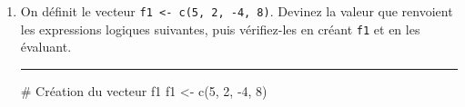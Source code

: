 \documentclass[12pt,twosided, notitlepage]{book}
\newenvironment{Shaded}{}{}
\newcommand{\CommentTok}[1]{\textcolor[rgb]{0.00,0.50,0.00}{#1}}
\newcommand{\DecValTok}[1]{#1}
\newcommand{\KeywordTok}[1]{\textcolor[rgb]{0.00,0.00,1.00}{#1}}
\newcommand{\NormalTok}[1]{#1}
\newcommand{\OperatorTok}[1]{#1}
\newcommand{\StringTok}[1]{\textcolor[rgb]{0.00,0.50,0.50}{#1}}
\newif \ifsol
\renewenvironment{Shaded}{\begin{snugshade}}{\end{snugshade}}
\begin{document}
\begin{enumerate}
\def\labelenumi{\alph{enumi}.}
\item
  On définit le vecteur \texttt{f1\ \textless{}-\ c(5,\ 2,\ -4,\ 8)}.
  Devinez la valeur que renvoient les expressions logiques suivantes,
  puis vérifiez-les en créant \texttt{f1} et en les
  évaluant.\index{\texttt{==}}\index{\texttt{<}}\index{\texttt{\&}}

\begin{Shaded}
\end{Shaded}

  \ifsol 

  \begin{center} \rule{0.5\linewidth}{\linethickness}\end{center}

\begin{Shaded}
\begin{Highlighting}[]
\CommentTok{# Création du vecteur f1}
\NormalTok{f1 <-}\StringTok{ }\KeywordTok{c}\NormalTok{(}\DecValTok{5}\NormalTok{, }\DecValTok{2}\NormalTok{, }\DecValTok{-4}\NormalTok{, }\DecValTok{8}\NormalTok{)}


\end{Highlighting}
\end{Shaded}
\end{enumerate}
\end{document}
